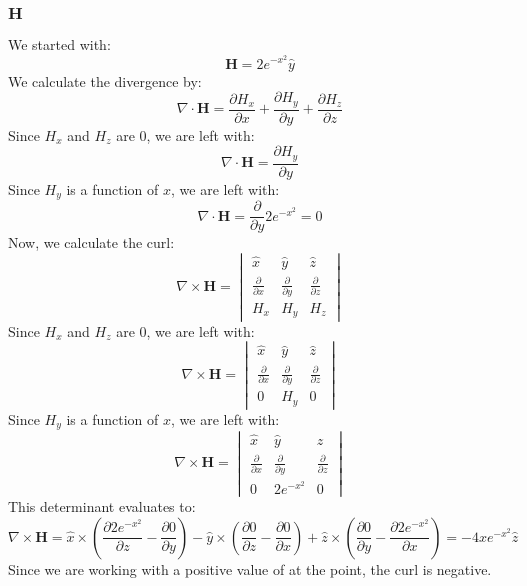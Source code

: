 \documentclass{article}
\begin{document}
\subsubsection{$\mathbf{H}$}
We started with:
\begin{equation}
    \mathbf{H}=2e^{-x^{2}}\hat{y}
\end{equation}
We calculate the divergence by:
\begin{equation}
    \nabla \cdot \mathbf{H} = \frac{\partial H_x}{\partial x} + \frac{\partial H_y}{\partial y} + \frac{\partial H_z}{\partial z}
\end{equation}
Since $H_x$ and $H_z$ are 0, we are left with:
\begin{equation}
    \nabla \cdot \mathbf{H} = \frac{\partial H_y}{\partial y}
\end{equation}
Since $H_y$ is a function of $x$, we are left with:
\begin{equation}
    \nabla \cdot \mathbf{H} = \frac{\partial}{\partial y}2e^{-x^{2}}=0
\end{equation}
Now, we calculate the curl:
\begin{equation}
    \nabla \times \mathbf{H} = \begin{vmatrix}
    \hat{x} & \hat{y} & \hat{z}\\
    \frac{\partial}{\partial x} & \frac{\partial}{\partial y} & \frac{\partial}{\partial z}\\
    H_x & H_y & H_z
    \end{vmatrix}
\end{equation}
Since $H_x$ and $H_z$ are 0, we are left with:
\begin{equation}
    \nabla \times \mathbf{H} = \begin{vmatrix}
    \hat{x} & \hat{y} & \hat{z}\\
    \frac{\partial}{\partial x} & \frac{\partial}{\partial y} & \frac{\partial}{\partial z}\\
    0 & H_y & 0
    \end{vmatrix}
\end{equation}
Since $H_y$ is a function of $x$, we are left with:
\begin{equation}
    \nabla \times \mathbf{H} = \begin{vmatrix}
    \hat{x} & \hat{y} & \hat{z}\\
    \frac{\partial}{\partial x} & \frac{\partial}{\partial y} & \frac{\partial}{\partial z}\\
    0 & 2e^{-x^{2}} & 0
    \end{vmatrix}
\end{equation}
This determinant evaluates to:
\begin{equation}
    \nabla \times \mathbf{H} = \hat{x}\times\left(\frac{\partial 2e^{-x^{2}}}{\partial z}-\frac{\partial 0}{\partial y}\right) - \hat{y}\times\left(\frac{\partial 0}{\partial z}-\frac{\partial 0}{\partial x}\right) + \hat{z}\times\left(\frac{\partial 0}{\partial y}-\frac{\partial 2e^{-x^{2}}}{\partial x}\right)=-4xe^{-x^{2}}\hat{z}
\end{equation}
Since we are working with a positive value of at the point, the curl is negative.
\end{document}
